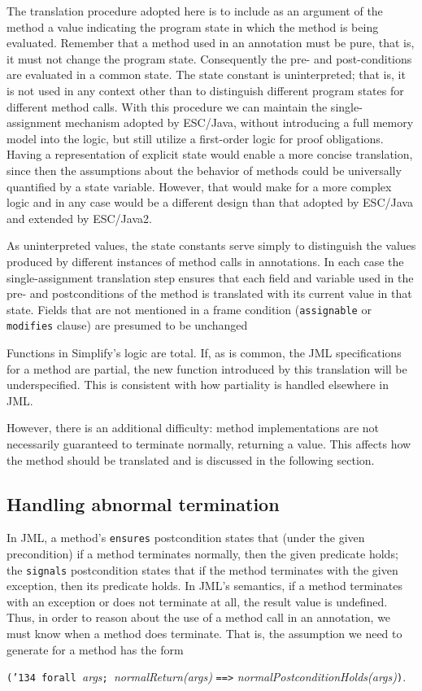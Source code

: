 \documentclass{sig-alternate2}
\begin{document}
The translation procedure adopted here is to include as an argument of the 
method a value indicating the
program state in which the method is being evaluated.  
Remember that a method used in
an annotation must be pure, that is, it must not change the program state.
Consequently the pre- and post-conditions are evaluated in a common state.
The state constant is uninterpreted;
that is, it is not used in any context other than to distinguish different program states 
for different method calls.
With this procedure we can maintain the single-assignment mechanism adopted by ESC/Java,
without introducing a full memory model into the logic,
but still utilize a first-order logic for proof obligations.  Having a representation of explicit state
would enable a more concise translation, since then the assumptions about the behavior of
methods could be universally quantified by a state variable.  However, that would make for a
more complex logic and in any case would be a different design than that adopted by ESC/Java 
and extended by ESC/Java2.

As uninterpreted values, the state constants serve simply to distinguish the values produced by
different instances of method calls in annotations.  In each case the single-assignment
translation step ensures that each field and variable used in the pre- and postconditions of the
method is translated with its current value in that state.  Fields that are not mentioned in
a frame condition ({\tt assignable} or {\tt modifies} clause) are presumed to be unchanged

Functions in Simplify's logic are total.  If, as is common, the JML specifications for a method are 
partial, the new function introduced by this translation will be underspecified.  This is consistent
with how partiality is handled elsewhere in JML.
 
However, there is an additional difficulty: 
method implementations are not necessarily guaranteed to terminate normally,
returning a value.  This affects how the method should
 be translated and is discussed in the following section.

\subsection{Handling abnormal termination}
\label{sec:abnormal}

In JML, a method's \texttt{ensures} postcondition states that (under the given precondition) if a method terminates normally, then the given predicate holds; the \texttt{signals} postcondition states that if the method terminates with the given exception, then its predicate holds.  In JML's
semantics, if a method terminates with an exception or does not terminate at all, the result value
is undefined.
Thus, in order to reason about the use of a method call in an annotation, we must know when a method does terminate.  That is, the
assumption we need to generate for a method has the form
\begin{center} \texttt{(\char'134 forall }{\em args}\texttt{; }{\em normalReturn(args) }\texttt{==>} {\em normalPostconditionHolds(args)}\texttt{)}.\end{center}
\end{document}
